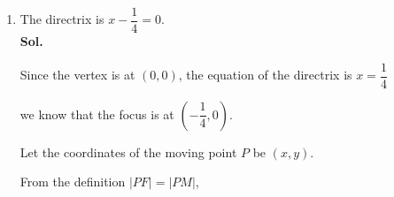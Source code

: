 \documentclass{report}
\newcommand{\sol}{\vspace{1em}\\\textbf{Sol.}}
\begin{document}
\begin{enumerate}[leftmargin=*]
\begin{enumerate}
\begin{multicols}{2}
\begin{center}
                        \end{center}
                    \end{multicols}
                    \vfill\null{}
              \item The directrix is $x - \dfrac{1}{4} = 0$. \sol{}
                    \begin{multicols}{2}
                        Since the vertex is at $(0, 0)$, the equation of the directrix is $x = \dfrac{1}{4}$

                        we know that the focus is at $\left(-\dfrac{1}{4}, 0\right)$.

                        Let the coordinates of the moving point $P$ be $(x, y)$.

                        From the definition $|PF| = |PM|$,


\end{multicols}
\end{enumerate}
\end{enumerate}
\end{document}
